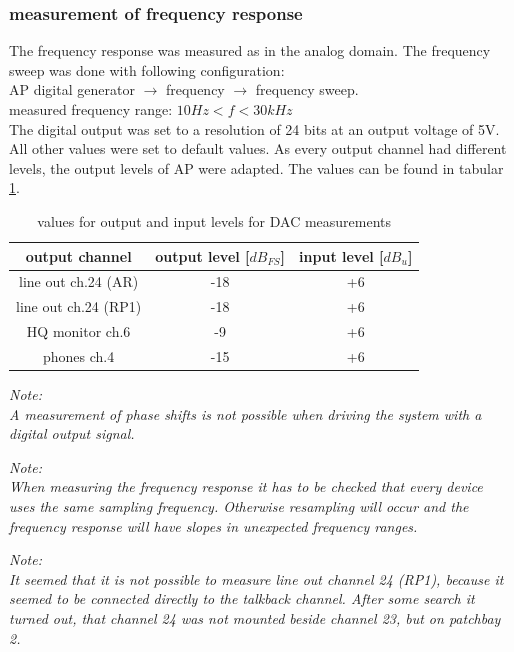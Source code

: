 \documentclass[11pt]{report}
\begin{document}
\subsubsection{measurement of frequency response}
The frequency response was measured as in the analog domain. The frequency sweep was done with following configuration:\\
AP digital generator $\rightarrow$ frequency $\rightarrow$ frequency sweep.\\
measured frequency range: $10Hz < f < 30kHz$\\
The digital output was set to a resolution of 24 bits at an output voltage of 5V. All other values were set to default values. As every output channel had different levels, the output levels of AP were adapted. The values can be found in tabular \ref{tab:dacvalues}.
\begin{table}
\begin{center}
\begin{tabular}{|c||c|c|}
\hline 
output channel  & 	output level [$dB_{FS}$]&		input level [$dB_u$]\\ \hline
line out ch.24 (AR) &	-18 &	+6\\
line out ch.24 (RP1) &	-18 &		+6\\
HQ monitor ch.6 &	-9 		& +6\\
phones ch.4 &	-15 &	+6\\
\hline
\end{tabular}
\caption{values for output and input levels for DAC measurements}
\label{tab:dacvalues}
\end{center}
\end{table}
\begin{leftbar}
\textit{ Note:\\
A measurement of phase shifts is not possible when driving the system with a digital output signal.}
\end{leftbar}
\begin{leftbar}
\textit{ Note:\\
When measuring the frequency response it has to be checked that every device uses the same sampling frequency. Otherwise resampling will occur and the frequency response will have slopes in unexpected frequency ranges.}
\end{leftbar}
\begin{leftbar}
\textit{Note:\\
It seemed that it is not possible to measure line out channel 24 (RP1), because it seemed to be connected directly to the talkback channel. After some search it turned out, that channel 24 was not mounted beside channel 23, but on patchbay 2.}
\end{leftbar}
\end{document}
